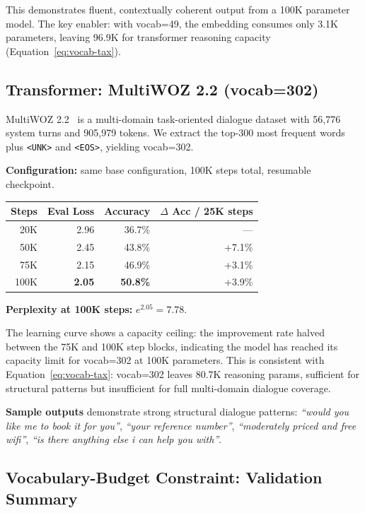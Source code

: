 \documentclass[11pt]{article}
\begin{document}
This demonstrates fluent, contextually coherent output from a 100K parameter model.
The key enabler: with vocab=49, the embedding consumes only 3.1K parameters, leaving
96.9K for transformer reasoning capacity (Equation~\ref{eq:vocab-tax}).

\subsection{Transformer: MultiWOZ 2.2 (vocab=302)}

MultiWOZ 2.2~\cite{budzianowski2019multiwoz} is a multi-domain task-oriented dialogue
dataset with 56,776 system turns and 905,979 tokens. We extract the top-300 most frequent
words plus \texttt{<UNK>} and \texttt{<EOS>}, yielding vocab=302.

\textbf{Configuration:} same base configuration, 100K steps total, resumable checkpoint.

\begin{center}
\begin{tabular}{rrrr}
\toprule
Steps & Eval Loss & Accuracy & $\Delta$ Acc / 25K steps \\
\midrule
20K  & 2.96 & 36.7\% & --- \\
50K  & 2.45 & 43.8\% & +7.1\% \\
75K  & 2.15 & 46.9\% & +3.1\% \\
100K & \textbf{2.05} & \textbf{50.8\%} & +3.9\% \\
\bottomrule
\end{tabular}
\end{center}

\textbf{Perplexity at 100K steps:} $e^{2.05} = 7.78$.

The learning curve shows a capacity ceiling: the improvement rate halved between
the 75K and 100K step blocks, indicating the model has reached its capacity limit
for vocab=302 at 100K parameters. This is consistent with Equation~\ref{eq:vocab-tax}:
vocab=302 leaves 80.7K reasoning params, sufficient for structural patterns but
insufficient for full multi-domain dialogue coverage.

\textbf{Sample outputs} demonstrate strong structural dialogue patterns:
\textit{``would you like me to book it for you''}, \textit{``your reference number''},
\textit{``moderately priced and free wifi''}, \textit{``is there anything else i can help you with''}.

\subsection{Vocabulary-Budget Constraint: Validation Summary}
\end{document}
